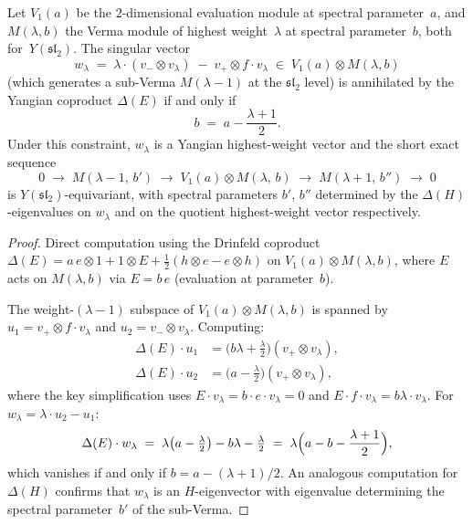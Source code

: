 \begin{proposition}
\label{prop:baxter-yangian-equivariance}
Let $V_1(a)$ be the $2$-dimensional evaluation module at spectral
parameter~$a$, and $M(\lambda, b)$ the Verma module of highest
weight~$\lambda$ at spectral parameter~$b$, both
for~$Y(\mathfrak{sl}_2)$. The singular vector
\[
 w_\lambda
 \;=\;
 \lambda \cdot (v_- \otimes v_\lambda)
 \;-\;
 v_+ \otimes f \cdot v_\lambda
 \;\in\; V_1(a) \otimes M(\lambda, b)
\]
(which generates a sub-Verma $M(\lambda-1)$ at the
$\mathfrak{sl}_2$ level) is annihilated by the Yangian coproduct
$\Delta(E)$ if and only if
\begin{equation}\label{eq:baxter-spectral-constraint}
 b \;=\; a - \frac{\lambda + 1}{2}.
\end{equation}
Under this constraint, $w_\lambda$ is a Yangian highest-weight
vector and the short exact sequence
\begin{equation}\label{eq:baxter-ses-yangian}
 0 \;\to\; M(\lambda - 1,\, b')
 \;\to\; V_1(a) \otimes M(\lambda,\, b)
 \;\to\; M(\lambda + 1,\, b'')
 \;\to\; 0
\end{equation}
is $Y(\mathfrak{sl}_2)$-equivariant, with spectral parameters
$b'$, $b''$ determined by the $\Delta(H)$-eigenvalues on $w_\lambda$
and on the quotient highest-weight vector respectively.
\end{proposition}

\begin{proof}
Direct computation using the Drinfeld coproduct
$\Delta(E) = a\,e \otimes 1 + 1 \otimes E
+ \tfrac{1}{2}(h \otimes e - e \otimes h)$
on $V_1(a) \otimes M(\lambda, b)$, where $E$ acts on $M(\lambda, b)$
via $E = b\,e$ (evaluation at parameter~$b$).

The weight-$(\lambda - 1)$ subspace of
$V_1(a) \otimes M(\lambda, b)$
is spanned by $u_1 = v_+ \otimes f \cdot v_\lambda$ and
$u_2 = v_- \otimes v_\lambda$. Computing:
\begin{align*}
 \Delta(E) \cdot u_1
 &= \bigl(b\lambda + \tfrac{\lambda}{2}\bigr)
 (v_+ \otimes v_\lambda),\\
 \Delta(E) \cdot u_2
 &= \bigl(a - \tfrac{\lambda}{2}\bigr)
 (v_+ \otimes v_\lambda),
\end{align*}
where the key simplification uses
$E \cdot v_\lambda = b \cdot e \cdot v_\lambda = 0$
and $E \cdot f \cdot v_\lambda = b\lambda \cdot v_\lambda$.
For $w_\lambda = \lambda \cdot u_2 - u_1$:
\[
 \Delta(E) \cdot w_\lambda
 \;=\;
 \lambda\bigl(a - \tfrac{\lambda}{2}\bigr)
 - b\lambda - \tfrac{\lambda}{2}
 \;=\;
 \lambda\Bigl(a - b - \frac{\lambda + 1}{2}\Bigr),
\]
which vanishes if and only if $b = a - (\lambda + 1)/2$.
An analogous computation for $\Delta(H)$ confirms that $w_\lambda$
is an $H$-eigenvector with eigenvalue determining the spectral
parameter~$b'$ of the sub-Verma.
\end{proof}


